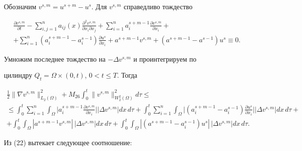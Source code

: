 \begin{pf}


Обозначим $v^{s,m}=u^{s+m}-u^s$. Для $v^{s,m}$ справедливо тождество


\begin{multline}


\frac{\partial v^{s,m}}{\partial t}-\sum^n_{i,j=1}a_{ij}(x)


\frac{\partial^2 v^{s,m}}{\partial x_i\partial x_j}+


\sum^n_{i=1}a^{s+m-1}_i


\frac{\partial v^{s,m}}{\partial x_i}+\\


+\sum^n_{i=1}(a^{s+m-1}_i-a^{s-1}_i)


\frac{\partial u^s}{\partial x_i}+a^{s+m-1}v^{s,m}+


(a^{s+m-1}-a^{s-1})u^s\equiv 0.


\end{multline}


Умножим последнее тождество на $-\Delta v^{s,m}$ и проинтегрируем по


цилиндру $Q_t=\Omega\times(0,t)$, $0<t\le T$. Тогда


\begin{multline}


\frac{1}{2}\|\nabla v^{s,m}\|^2_{L_2(\Omega)}+M_{26}


\int^t_0\|v^{s,m}\|^2_{W^2_2(\Omega)}d\tau \le \\


\le\int^t_0\sum^n_{i=1}\int_\Omega\biggl|


a^{s+m-1}_i


\frac{\partial v^{s,m}}{\partial x_i}\biggr|


|\Delta v^{s,m}|dx\,d\tau+\int^t_0\sum^n_{i=1}\int_\Omega


\biggl|(a^{s+m-1}_i-a^{s-1}_i)


\frac{\partial u^s}{\partial x_i}\biggr|


|\Delta v^{s,m}|dx\,d\tau+\\


+\int^t_0\int_\Omega |a^{s+m-1}v^{s,m}|\,


|\Delta v^{s,m}|dx\,d\tau+\int^t_0\int_\Omega


|(a^{s+m-1}-a^{s-1}_i)u^s|\,


|\Delta v^{s,m}|dx\,d\tau.


\end{multline}


Из (22) вытекает следующее соотношение:



\end{pf}
